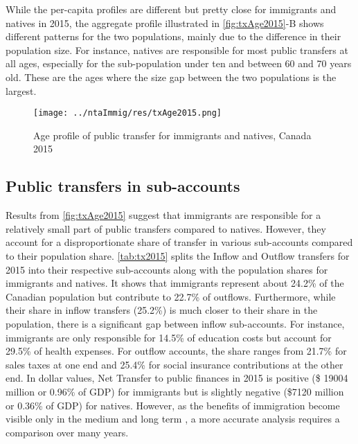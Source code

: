 \vspace{0.7em}\par
While the per-capita profiles are different but pretty close for immigrants and natives in 2015, the aggregate profile illustrated in \autoref{fig:txAge2015}-B shows different patterns for the two populations, mainly due to the difference in their population size.
For instance, natives are responsible for most public transfers at all ages, especially for the sub-population under ten and between 60 and 70 years old. These are the ages where the size gap between the two populations is the largest.

\begin{figure}[H]%
  \caption{Age profile of public transfer for immigrants and natives, Canada 2015}
  \texttt{[image: ../ntaImmig/res/txAge2015.png]}%
  \label{fig:txAge2015}%
\end{figure}%

\subsection{Public transfers in sub-accounts}
Results from \autoref{fig:txAge2015} suggest that immigrants are responsible for a relatively small part of public transfers compared to natives.
However, they account for a disproportionate share of transfer in various sub-accounts compared to their population share.
\autoref{tab:tx2015} splits the Inflow and Outflow transfers for 2015 into their respective sub-accounts along with the population shares for immigrants and natives.
It shows that immigrants represent about 24.2\% of the Canadian population but contribute to 22.7\% of outflows.
Furthermore, while their share in inflow transfers (25.2\%) is much closer to their share in the population, there is a significant gap between inflow sub-accounts.
For instance, immigrants are only responsible for 14.5\% of education costs but account for 29.5\% of health expenses.
For outflow accounts, the share ranges from 21.7\% for sales taxes at one end and 25.4\% for social insurance contributions at the other end.
In dollar values, Net Transfer to public finances in 2015 is positive (\$ \num{19004} million or 0.96\% of GDP) for immigrants but is slightly negative (\$\num{7120} million or 0.36\% of GDP) for natives.
However, as the benefits of immigration become visible only in the medium and long term \citep{Goldin:2011tg}, a more accurate analysis requires a comparison over many years.

